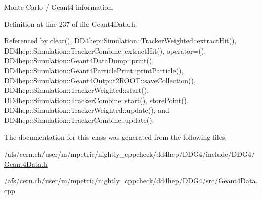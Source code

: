 Monte Carlo / Geant4 information. 



Definition at line 237 of file Geant4\+Data.\+h.



Referenced by clear(), D\+D4hep\+::\+Simulation\+::\+Tracker\+Weighted\+::extract\+Hit(), D\+D4hep\+::\+Simulation\+::\+Tracker\+Combine\+::extract\+Hit(), operator=(), D\+D4hep\+::\+Simulation\+::\+Geant4\+Data\+Dump\+::print(), D\+D4hep\+::\+Simulation\+::\+Geant4\+Particle\+Print\+::print\+Particle(), D\+D4hep\+::\+Simulation\+::\+Geant4\+Output2\+R\+O\+O\+T\+::save\+Collection(), D\+D4hep\+::\+Simulation\+::\+Tracker\+Weighted\+::start(), D\+D4hep\+::\+Simulation\+::\+Tracker\+Combine\+::start(), store\+Point(), D\+D4hep\+::\+Simulation\+::\+Tracker\+Weighted\+::update(), and D\+D4hep\+::\+Simulation\+::\+Tracker\+Combine\+::update().



The documentation for this class was generated from the following files\+:\begin{DoxyCompactItemize}
\item 
/afs/cern.\+ch/user/m/mpetric/nightly\+\_\+cppcheck/dd4hep/\+D\+D\+G4/include/\+D\+D\+G4/\hyperlink{_geant4_data_8h}{Geant4\+Data.\+h}\item 
/afs/cern.\+ch/user/m/mpetric/nightly\+\_\+cppcheck/dd4hep/\+D\+D\+G4/src/\hyperlink{_geant4_data_8cpp}{Geant4\+Data.\+cpp}\end{DoxyCompactItemize}
